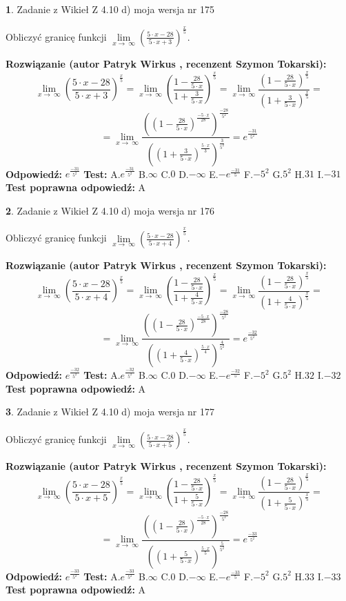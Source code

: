\documentclass[12pt, a4paper]{article}
\theoremstyle{definition} %
\newtheorem{zad}{}
\newcommand{\zadStart}[1]{\begin{zad}#1\newline}
\newcommand{\zadStop}{\end{zad}}
\newcommand{\rozwStart}[2]{\noindent \textbf{Rozwiązanie (autor #1 , recenzent #2): }\newline}
\newcommand{\rozwStop}{\newline}
\newcommand{\odpStart}{\noindent \textbf{Odpowiedź:}\newline}
\newcommand{\odpStop}{\newline}
\newcommand{\testStart}{\noindent \textbf{Test:}\newline}
\newcommand{\testStop}{\newline}
\newcommand{\kluczStart}{\noindent \textbf{Test poprawna odpowiedź:}\newline}
\newcommand{\kluczStop}{\newline}
\begin{document}
\zadStart{Zadanie z Wikieł Z 4.10 d) moja wersja nr 175}


Obliczyć granicę funkcji  $\lim\limits_{x\to\ \infty}(\frac{5\cdot x-28}{5\cdot x+3})^{\frac{x}{5}}$.
\zadStop
\rozwStart{Patryk Wirkus}{Szymon Tokarski}
$$\lim\limits_{x\to\ \infty}(\frac{5\cdot x-28}{5\cdot x+3})^{\frac{x}{5}} = \lim\limits_{x\to\ \infty}(\frac{1-\frac{28}{5\cdot x}}{1+\frac{3}{5\cdot x}})^{\frac{x}{5}}=\lim\limits_{x\to\ \infty}\frac{(1-\frac{28}{5\cdot x})^{\frac{x}{5}}}{(1+\frac{3}{5\cdot x})^{\frac{x}{5}}}=$$
$$=\lim\limits_{x\to\ \infty}\frac{((1-\frac{28}{5\cdot x})^{\frac{-5\cdot x}{28}})^{\frac{-28}{5^{2}}}}{((1+\frac{3}{5\cdot x})^{\frac{5\cdot x}{3}})^{\frac{3}{5^{2}}}}=e^{\frac{-31}{5^{2}}}$$
\rozwStop
\odpStart
$e^{\frac{-31}{5^{2}}}$
\odpStop
\testStart
A.$e^{\frac{-31}{5^{2}}}$ B.$\infty$ C.$0$ D.$-\infty$ E.$-e^{\frac{-31}{5}}$
F.$-5^{2}$ G.$5^{2}$
H.$31$
I.$-31$
\testStop
\kluczStart
A
\kluczStop



\zadStart{Zadanie z Wikieł Z 4.10 d) moja wersja nr 176}


Obliczyć granicę funkcji  $\lim\limits_{x\to\ \infty}(\frac{5\cdot x-28}{5\cdot x+4})^{\frac{x}{5}}$.
\zadStop
\rozwStart{Patryk Wirkus}{Szymon Tokarski}
$$\lim\limits_{x\to\ \infty}(\frac{5\cdot x-28}{5\cdot x+4})^{\frac{x}{5}} = \lim\limits_{x\to\ \infty}(\frac{1-\frac{28}{5\cdot x}}{1+\frac{4}{5\cdot x}})^{\frac{x}{5}}=\lim\limits_{x\to\ \infty}\frac{(1-\frac{28}{5\cdot x})^{\frac{x}{5}}}{(1+\frac{4}{5\cdot x})^{\frac{x}{5}}}=$$
$$=\lim\limits_{x\to\ \infty}\frac{((1-\frac{28}{5\cdot x})^{\frac{-5\cdot x}{28}})^{\frac{-28}{5^{2}}}}{((1+\frac{4}{5\cdot x})^{\frac{5\cdot x}{4}})^{\frac{4}{5^{2}}}}=e^{\frac{-32}{5^{2}}}$$
\rozwStop
\odpStart
$e^{\frac{-32}{5^{2}}}$
\odpStop
\testStart
A.$e^{\frac{-32}{5^{2}}}$ B.$\infty$ C.$0$ D.$-\infty$ E.$-e^{\frac{-32}{5}}$
F.$-5^{2}$ G.$5^{2}$
H.$32$
I.$-32$
\testStop
\kluczStart
A
\kluczStop



\zadStart{Zadanie z Wikieł Z 4.10 d) moja wersja nr 177}


Obliczyć granicę funkcji  $\lim\limits_{x\to\ \infty}(\frac{5\cdot x-28}{5\cdot x+5})^{\frac{x}{5}}$.
\zadStop
\rozwStart{Patryk Wirkus}{Szymon Tokarski}
$$\lim\limits_{x\to\ \infty}(\frac{5\cdot x-28}{5\cdot x+5})^{\frac{x}{5}} = \lim\limits_{x\to\ \infty}(\frac{1-\frac{28}{5\cdot x}}{1+\frac{5}{5\cdot x}})^{\frac{x}{5}}=\lim\limits_{x\to\ \infty}\frac{(1-\frac{28}{5\cdot x})^{\frac{x}{5}}}{(1+\frac{5}{5\cdot x})^{\frac{x}{5}}}=$$
$$=\lim\limits_{x\to\ \infty}\frac{((1-\frac{28}{5\cdot x})^{\frac{-5\cdot x}{28}})^{\frac{-28}{5^{2}}}}{((1+\frac{5}{5\cdot x})^{\frac{5\cdot x}{5}})^{\frac{5}{5^{2}}}}=e^{\frac{-33}{5^{2}}}$$
\rozwStop
\odpStart
$e^{\frac{-33}{5^{2}}}$
\odpStop
\testStart
A.$e^{\frac{-33}{5^{2}}}$ B.$\infty$ C.$0$ D.$-\infty$ E.$-e^{\frac{-33}{5}}$
F.$-5^{2}$ G.$5^{2}$
H.$33$
I.$-33$
\testStop
\kluczStart
A
\kluczStop
\end{document}
